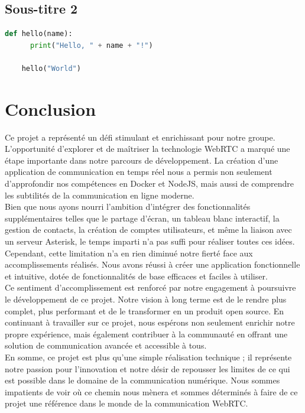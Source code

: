 \documentclass[12pt, a4paper, oneside]{Thesis}
\begin{document}
\subsection{Sous-titre 2}

\begin{lstlisting}[language=Python, caption={Exemple de code Python}, label=mon-code-python]
	def hello(name):
	  print("Hello, " + name + "!")
	
	hello("World")
\end{lstlisting}

\newpage

\section{Conclusion}

Ce projet a représenté un défi stimulant et enrichissant pour notre groupe. L'opportunité d'explorer et de maîtriser la technologie WebRTC a marqué une étape importante dans notre parcours de développement. La création d'une application de communication en temps réel nous a permis non seulement d'approfondir nos compétences en Docker et NodeJS, mais aussi de comprendre les subtilités de la communication en ligne moderne.\\

Bien que nous ayons nourri l'ambition d'intégrer des fonctionnalités supplémentaires telles que le partage d'écran, un tableau blanc interactif, la gestion de contacts, la création de comptes utilisateurs, et même la liaison avec un serveur Asterisk, le temps imparti n'a pas suffi pour réaliser toutes ces idées. Cependant, cette limitation n'a en rien diminué notre fierté face aux accomplissements réalisés. Nous avons réussi à créer une application fonctionnelle et intuitive, dotée de fonctionnalités de base efficaces et faciles à utiliser.\\

Ce sentiment d'accomplissement est renforcé par notre engagement à poursuivre le développement de ce projet. Notre vision à long terme est de le rendre plus complet, plus performant et de le transformer en un produit open source. En continuant à travailler sur ce projet, nous espérons non seulement enrichir notre propre expérience, mais également contribuer à la communauté en offrant une solution de communication avancée et accessible à tous.\\

En somme, ce projet est plus qu'une simple réalisation technique ; il représente notre passion pour l'innovation et notre désir de repousser les limites de ce qui est possible dans le domaine de la communication numérique. Nous sommes impatients de voir où ce chemin nous mènera et sommes déterminés à faire de ce projet une référence dans le monde de la communication WebRTC.\\
\end{document}
